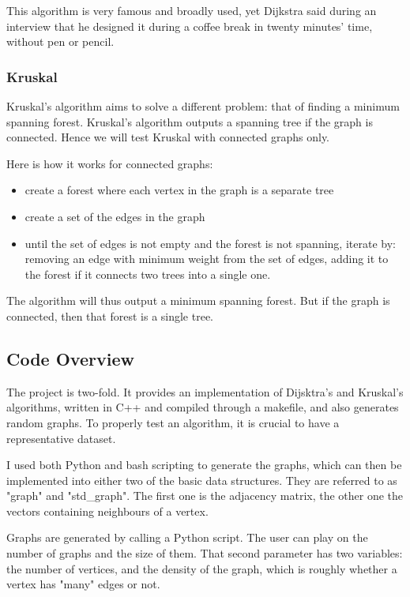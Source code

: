 \documentclass{article}
\begin{document}
This algorithm is very famous and broadly used, yet Dijkstra said during an interview that he designed it during a coffee break in twenty minutes' time, without pen or pencil.

\subsubsection{Kruskal}

Kruskal's algorithm aims to solve a different problem: that of finding a minimum spanning forest. Kruskal's algorithm outputs a spanning tree if the graph is connected. Hence we will test Kruskal with connected graphs only.

Here is how it works for connected graphs:

\begin{itemize}

\item
	create a forest where each vertex in the graph is a separate tree
\item
	create a set of the edges in the graph
\item
	until the set of edges is not empty and the forest is not spanning, iterate by: removing an edge with minimum weight from the set of edges, adding it to the forest if it connects two trees into a single one.
\end{itemize}

The algorithm will thus output a minimum spanning forest. But if the graph is connected, then that forest is a single tree.

\subsection{Code Overview}

The project is two-fold. It provides an implementation of Dijsktra's and Kruskal's algorithms, written in C++ and compiled through a makefile, and also generates random graphs. To properly test an algorithm, it is crucial to have a representative dataset.

I used both Python and bash scripting to generate the graphs, which can then be implemented into either two of the basic data structures. They are referred to as "graph" and "std\_graph". The first one is the adjacency matrix, the other one the vectors containing neighbours of a vertex.

Graphs are generated by calling a Python script. The user can play on the number of graphs and the size of them. That second parameter has two variables: the number of vertices, and the density of the graph, which is roughly whether a vertex has "many" edges or not.
\end{document}
